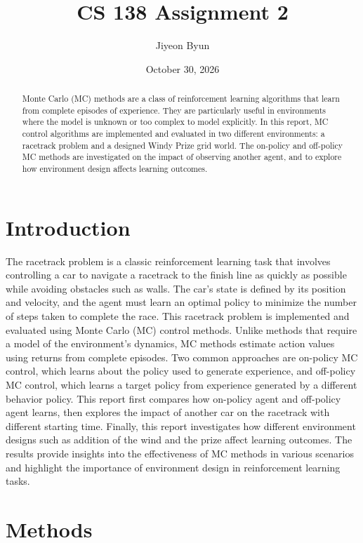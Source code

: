 \documentclass{article}
\title{CS 138 Assignment 2}
\author{Jiyeon Byun}
\date{October 30, 2026}
\begin{document}
\maketitle

\begin{abstract}
    Monte Carlo (MC) methods are a class of reinforcement learning algorithms
    that learn from complete episodes of experience. They are particularly
    useful in environments where the model is unknown or too complex to model
    explicitly. In this report, MC control algorithms are implemented and
    evaluated in two different environments: a racetrack problem and a designed
    Windy Prize grid world. The on-policy and off-policy MC methods are
    investigated on the impact of observing another agent, and to explore how
    environment design affects learning outcomes.
\end{abstract}

\section{Introduction}
    The racetrack problem is a classic reinforcement learning task that involves
    controlling a car to navigate a racetrack to the finish line as quickly as
    possible while avoiding obstacles such as walls. The car's state is defined
    by its position and velocity, and the agent must learn an optimal policy to
    minimize the number of steps taken to complete the race. This racetrack
    problem is implemented and evaluated using Monte Carlo (MC) control methods.
    Unlike methods that require a model of the environment's dynamics, MC
    methods estimate action values using returns from complete episodes. Two
    common approaches are on-policy MC control, which learns about the policy
    used to generate experience, and off-policy MC control, which learns a
    target policy from experience generated by a different behavior policy. This
    report first compares how on-policy agent and off-policy agent learns, then
    explores the impact of another car on the racetrack with different starting
    time. Finally, this report investigates how different environment designs
    such as addition of the wind and the prize affect learning outcomes. The
    results provide insights into the effectiveness of MC methods in various
    scenarios and highlight the importance of environment design in
    reinforcement learning tasks.


\section{Methods}
\end{document}
